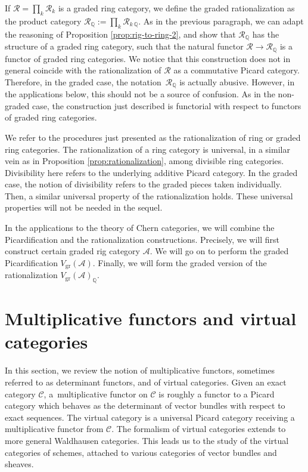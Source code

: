 \documentclass[11pt]{article}
\theoremstyle{plain}
\theoremstyle{definition}
\newcommand{\QBbb}{\mathbb Q}
\newcommand{\Acal}{\mathcal A}
\newcommand{\Ccal}{\mathcal C}
\newcommand{\Rcal}{\mathcal R}
\begin{document}
If $\Rcal=\prod_{k}\Rcal_{k}$ is a graded ring category, we define the graded rationalization as the product category $\Rcal_{\QBbb}:=\prod_{k}\Rcal_{k\ \QBbb}$. As in the previous paragraph, we can adapt the reasoning of Proposition \ref{prop:rig-to-ring-2}, and show that $\Rcal_{\QBbb}$ has the structure of a graded ring category, such that the natural functor $\Rcal\to\Rcal_{\QBbb}$ is a functor of graded ring categories. We notice that this construction does not in general coincide with the rationalization of $\Rcal$ as a commutative Picard category. Therefore, in the graded case, the notation~$\Rcal_{\QBbb}$ is actually abusive. However, in the applications below, this should not be a source of confusion. As in the non-graded case, the construction just described is functorial with respect to functors of graded ring categories.

We refer to the procedures just presented as the rationalization of ring or graded ring categories. The rationalization of a ring category is universal, in a similar vein as in Proposition \ref{prop:rationalization}, among divisible ring categories. Divisibility here refers to the underlying additive Picard category. In the graded case, the notion of divisibility refers to the graded pieces taken individually. Then, a similar universal property of the rationalization holds. These universal properties will not be needed in the sequel.

In the applications to the theory of Chern categories, we will combine the Picardification and the rationalization constructions. Precisely, we will first construct certain graded rig category $\Acal$. We will go on to perform the graded Picardification $V_{\mathrm{gr}}(\Acal)$. Finally, we will form the graded version of the rationalization $V_{\mathrm{gr}}(\Acal)_{\QBbb}$.

\section{Multiplicative functors and virtual categories}\label{sec:multiplicative-functors-virtual-categories}
In this section, we review the notion of multiplicative functors, sometimes referred to as determinant functors, and of virtual categories. Given an exact category $\Ccal$, a~multiplicative functor on $\Ccal$ is roughly a functor to a Picard category which behaves as the determinant of vector bundles with respect to exact sequences. The virtual category is a universal Picard category receiving a multiplicative functor from $\Ccal$. The formalism of virtual categories extends to more general Waldhausen categories. This leads us to the study of the virtual categories of schemes, attached to various categories of vector bundles and sheaves.
\end{document}
